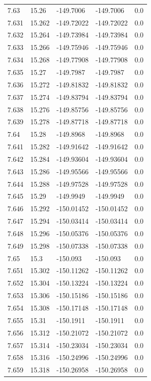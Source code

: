 \begin{tabular}{lllll}
7.63 & 15.26 & -149.7006 & -149.7006 & 0.0 \\
7.631 & 15.262 & -149.72022 & -149.72022 & 0.0 \\
7.632 & 15.264 & -149.73984 & -149.73984 & 0.0 \\
7.633 & 15.266 & -149.75946 & -149.75946 & 0.0 \\
7.634 & 15.268 & -149.77908 & -149.77908 & 0.0 \\
7.635 & 15.27 & -149.7987 & -149.7987 & 0.0 \\
7.636 & 15.272 & -149.81832 & -149.81832 & 0.0 \\
7.637 & 15.274 & -149.83794 & -149.83794 & 0.0 \\
7.638 & 15.276 & -149.85756 & -149.85756 & 0.0 \\
7.639 & 15.278 & -149.87718 & -149.87718 & 0.0 \\
7.64 & 15.28 & -149.8968 & -149.8968 & 0.0 \\
7.641 & 15.282 & -149.91642 & -149.91642 & 0.0 \\
7.642 & 15.284 & -149.93604 & -149.93604 & 0.0 \\
7.643 & 15.286 & -149.95566 & -149.95566 & 0.0 \\
7.644 & 15.288 & -149.97528 & -149.97528 & 0.0 \\
7.645 & 15.29 & -149.9949 & -149.9949 & 0.0 \\
7.646 & 15.292 & -150.01452 & -150.01452 & 0.0 \\
7.647 & 15.294 & -150.03414 & -150.03414 & 0.0 \\
7.648 & 15.296 & -150.05376 & -150.05376 & 0.0 \\
7.649 & 15.298 & -150.07338 & -150.07338 & 0.0 \\
7.65 & 15.3 & -150.093 & -150.093 & 0.0 \\
7.651 & 15.302 & -150.11262 & -150.11262 & 0.0 \\
7.652 & 15.304 & -150.13224 & -150.13224 & 0.0 \\
7.653 & 15.306 & -150.15186 & -150.15186 & 0.0 \\
7.654 & 15.308 & -150.17148 & -150.17148 & 0.0 \\
7.655 & 15.31 & -150.1911 & -150.1911 & 0.0 \\
7.656 & 15.312 & -150.21072 & -150.21072 & 0.0 \\
7.657 & 15.314 & -150.23034 & -150.23034 & 0.0 \\
7.658 & 15.316 & -150.24996 & -150.24996 & 0.0 \\
7.659 & 15.318 & -150.26958 & -150.26958 & 0.0 \\

\end{tabular}
